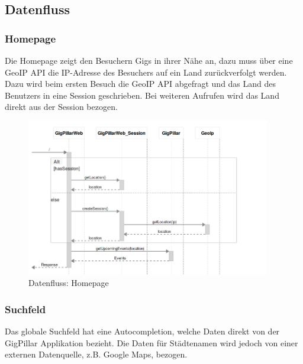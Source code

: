 \subsection{Datenfluss}\label{datenfluss}

\subsubsection{Homepage}\label{datenfluss-homepage}

Die Homepage zeigt den Besuchern Gigs in ihrer Nähe an, dazu muss über eine
GeoIP API die IP-Adresse des Besuchers auf ein Land zurückverfolgt werden.
Dazu wird beim ersten Besuch die GeoIP API abgefragt und das Land des Benutzers
in eine Session geschrieben. Bei weiteren Aufrufen wird das Land direkt aus der
Session bezogen.

%
%

\begin{figure}[!htb]
  \centering
  \includegraphics[width=0.95\textwidth]{konzept/datenfluss-homepage.png}
  \caption{Datenfluss: Homepage}
\end{figure}

\clearpage
\subsubsection{Suchfeld}\label{datenfluss-suchfeld}

Das globale Suchfeld hat eine Autocompletion, welche Daten direkt von
der GigPillar Applikation bezieht. Die Daten für Städtenamen wird jedoch von
einer externen Datenquelle, z.B. Google Maps, bezogen.

